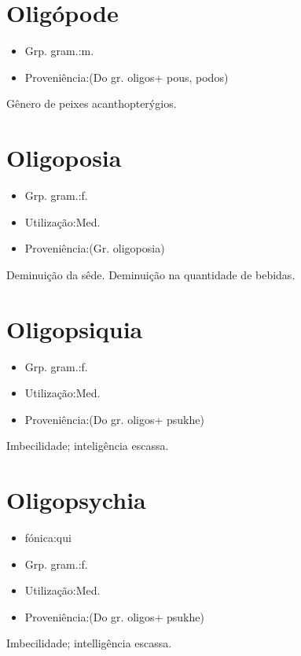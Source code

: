 \section{Oligópode}
\begin{itemize}
\item {Grp. gram.:m.}
\end{itemize}
\begin{itemize}
\item {Proveniência:(Do gr. \textunderscore oligos\textunderscore  + \textunderscore pous\textunderscore , \textunderscore podos\textunderscore )}
\end{itemize}
Gênero de peixes acanthopterýgios.
\section{Oligoposia}
\begin{itemize}
\item {Grp. gram.:f.}
\end{itemize}
\begin{itemize}
\item {Utilização:Med.}
\end{itemize}
\begin{itemize}
\item {Proveniência:(Gr. \textunderscore oligoposia\textunderscore )}
\end{itemize}
Deminuição da sêde.
Deminuição na quantidade de bebidas.
\section{Oligopsiquia}
\begin{itemize}
\item {Grp. gram.:f.}
\end{itemize}
\begin{itemize}
\item {Utilização:Med.}
\end{itemize}
\begin{itemize}
\item {Proveniência:(Do gr. \textunderscore oligos\textunderscore  + \textunderscore psukhe\textunderscore )}
\end{itemize}
Imbecilidade; inteligência escassa.
\section{Oligopsychia}
\begin{itemize}
\item {fónica:qui}
\end{itemize}
\begin{itemize}
\item {Grp. gram.:f.}
\end{itemize}
\begin{itemize}
\item {Utilização:Med.}
\end{itemize}
\begin{itemize}
\item {Proveniência:(Do gr. \textunderscore oligos\textunderscore  + \textunderscore psukhe\textunderscore )}
\end{itemize}
Imbecilidade; intelligência escassa.
